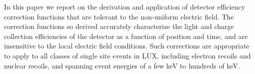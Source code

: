 %




In this paper we report on the derivation and application of detector efficiency correction functions
that are tolerant to the non-uniform electric field. The 
correction functions so derived accurately characterize the light and charge collection efficiencies 
of the detector as a function of position and time, and are insensitive to the local electric field 
conditions. Such corrections are
appropriate to apply to all classes of single site events in LUX, 
including electron recoils and nuclear recoils, and spanning 
event energies of a few keV to hundreds of keV. 






